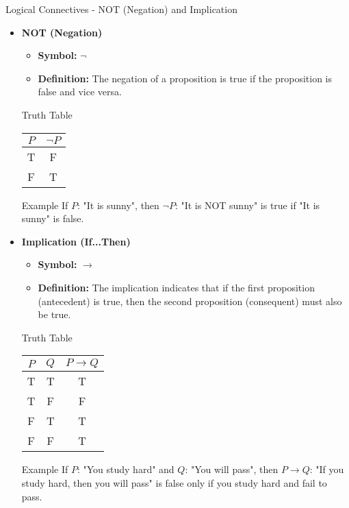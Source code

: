 \documentclass[aspectratio=169]{beamer}
\begin{document}
\begin{frame}[fragile]{Logical Connectives - NOT (Negation) and Implication}
    \begin{itemize}
        \item \textbf{NOT (Negation)}
            \begin{itemize}
                \item \textbf{Symbol:} $\neg$
                \item \textbf{Definition:} The negation of a proposition is true if the proposition is false and vice versa.
            \end{itemize}
            \begin{block}{Truth Table}
                \begin{tabular}{|c|c|}
                    \hline
                    $P$ & $\neg P$ \\
                    \hline
                    T & F \\
                    F & T \\
                    \hline
                \end{tabular}
            \end{block}
            \begin{block}{Example}
                If $P$: "It is sunny", then $\neg P$: "It is NOT sunny" is true if "It is sunny" is false.
            \end{block}
        
        \item \textbf{Implication (If...Then)}
            \begin{itemize}
                \item \textbf{Symbol:} $\rightarrow$
                \item \textbf{Definition:} The implication indicates that if the first proposition (antecedent) is true, then the second proposition (consequent) must also be true.
            \end{itemize}
            \begin{block}{Truth Table}
                \begin{tabular}{|c|c|c|}
                    \hline
                    $P$ & $Q$ & $P \rightarrow Q$ \\
                    \hline
                    T & T & T \\
                    T & F & F \\
                    F & T & T \\
                    F & F & T \\
                    \hline
                \end{tabular}
            \end{block}
            \begin{block}{Example}
                If $P$: "You study hard" and $Q$: "You will pass", then $P \rightarrow Q$: "If you study hard, then you will pass" is false only if you study hard and fail to pass.
            \end{block}
    \end{itemize}
\end{frame}
\end{document}
